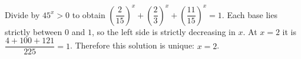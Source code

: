 Divide by $45^x>0$ to obtain $(\dfrac{2}{15})^x+(\dfrac{2}{3})^x+(\dfrac{11}{15})^x=1$. Each base lies strictly between $0$ and $1$, so the left side is strictly decreasing in $x$. At $x=2$ it is $\dfrac{4+100+121}{225}=1$. Therefore this solution is unique: $\boxed{x=2}$.
